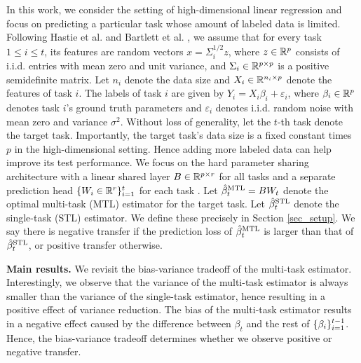 In this work, we consider the setting of high-dimensional linear regression and focus on predicting a particular task whose amount of labeled data is limited.
Following Hastie et al. \cite{HMRT19} and Bartlett et al. \cite{BLLT20}, we assume that for every task $1\le i\le t$, its features are random vectors $x = \Sigma_i^{1/2}z$, where $z\in\mathbb{R}^p$ consists of i.i.d. entries with mean zero and unit variance, and $\Sigma_i\in\mathbb{R}^{p\times p}$ is a positive semidefinite matrix.
Let $n_i$ denote the data size and $X_i\in\mathbb{R}^{n_i\times p}$ denote the features of task $i$.
The labels of task $i$ are given by $Y_i = X_i\beta_i + \varepsilon_i$, where $\beta_i\in\mathbb{R}^p$ denotes task $i$'s ground truth parameters and $\varepsilon_i$ denotes i.i.d. random noise with mean zero and variance $\sigma^2$.
Without loss of generality, let the $t$-th task denote the target task.
Importantly, the target task's data size is a fixed constant times $p$ in the high-dimensional setting.
Hence adding more labeled data can help improve its test performance.
We focus on the hard parameter sharing architecture with a linear shared layer $B\in\mathbb{R}^{p\times r}$ for all tasks and a separate prediction head $\{W_i \in \mathbb{R}^{r}\}_{i=1}^t$ for each task \cite{R17,MTDNN19,WZR20}.
Let $\hat{\beta}_t^{\text{MTL}} = B W_t$ denote the optimal multi-task (MTL) estimator for the target task.
Let $\hat{\beta}_t^{\text{STL}}$ denote the single-task (STL) estimator.
We define these precisely in Section \ref{sec_setup}.
We say there is negative transfer if the prediction loss of $\hat{\beta}_t^{\text{MTL}}$  is larger than that of $\hat{\beta}_t^{\text{STL}}$, or positive transfer otherwise.

\textbf{Main results.}
We revisit the bias-variance tradeoff of the multi-task estimator.
Interestingly, we observe that the variance of the multi-task estimator is always smaller than the variance of the single-task estimator, hence resulting in a positive effect of variance reduction.
The bias of the multi-task estimator results in a negative effect caused by the difference between $\beta_t$ and the rest of $\{\beta_i\}_{i=1}^{t-1}$.
Hence, the bias-variance tradeoff determines whether we observe positive or negative transfer.


